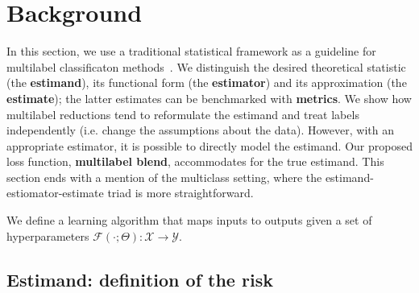 
\section{Background}
\label{section:background}

In this section, we use a traditional statistical framework as a guideline for multilabel classificaton methods~\citep{tukey}. We distinguish the desired theoretical statistic (the \textbf{estimand}), its functional form (the \textbf{estimator}) and its approximation (the \textbf{estimate}); the latter estimates can be benchmarked with \textbf{metrics}. We show how multilabel reductions tend to reformulate the estimand and treat labels independently (i.e. change the assumptions about the data). However, with an appropriate estimator, it is possible to directly model the estimand. Our proposed loss function, \textbf{multilabel blend}, accommodates for the true estimand. This section ends with a mention of the multiclass setting, where the estimand-estiomator-estimate triad is more straightforward. 

We define a learning algorithm that maps inputs to outputs given a set of hyperparameters \(\mathcal{F}(\cdot ; \Theta): \mathcal{X} \rightarrow \mathcal{Y}\). 

\subsection{Estimand: definition of the risk}
\label{section:background:estimand}


